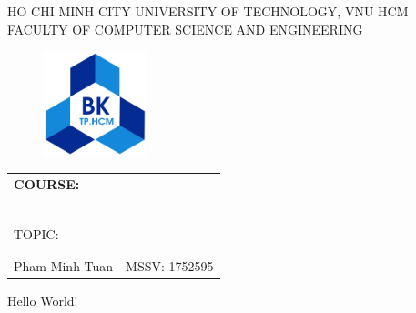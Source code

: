 \documentclass[a4paper, 11pt]{article}
\begin{document}
    \begin{titlepage}
        \begin{center}
            HO CHI MINH CITY UNIVERSITY OF TECHNOLOGY, VNU HCM \\
            FACULTY OF COMPUTER SCIENCE AND ENGINEERING
        \end{center}

        \vspace{1cm}

        \begin{figure}[h!]
            \begin{center}
                \includegraphics[width=3cm]{hcmut.png}
            \end{center}
        \end{figure}

        \vspace{1cm}

        \begin{center}
            \begin{tabular}{c}
                \multicolumn{1}{l}{\textbf{\LARGE COURSE:}} \\
                ~~\\
                \hline
                \\
                \multicolumn{1}{l}{\LARGE TOPIC: } \\
                \\
                \hline
                \\
                \hspace{5cm} Pham Minh Tuan - MSSV: 1752595
            \end{tabular}
        \end{center}
    \end{titlepage}

\newpage

\renewcommand*\contentsname{Contents:}
\tableofcontents

\newpage

Hello World!
\end{document}
